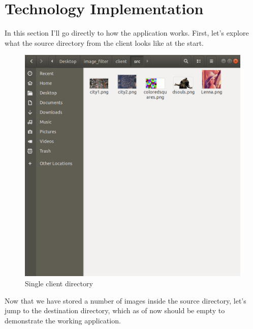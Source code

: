 \documentclass[a4paper,12pt]{article}
\begin{document}
	\section{Technology Implementation}

	In this section I'll go directly to how the application works. First, let's explore what the source directory from the client looks like at the start.
		
	\begin{figure}[h]
		\centering
		\includegraphics[width=\textwidth]{clientsrc.png}
		\caption{Single client directory}
	\end{figure}		
	
	Now that we have stored a number of images inside the source directory, let's jump to the destination directory, which as of now should be empty to demonstrate the working application.
	
	\vfill
	
\end{document}
